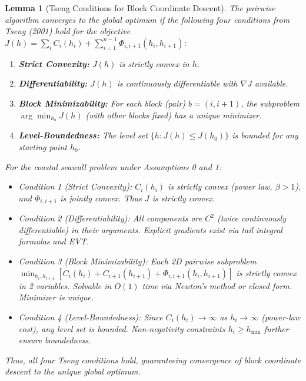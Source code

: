 \documentclass[12pt]{article}
\newtheorem{lemma}{Lemma}[section]
\theoremstyle{definition}
\begin{document}
\begin{lemma}[Tseng Conditions for Block Coordinate Descent]
\label{lem:tseng_conditions}
The pairwise algorithm converges to the global optimum if the following four conditions from Tseng (2001) hold for the objective $J(h) = \sum_i C_i(h_i) + \sum_{i=1}^{n-1} \Phi_{i,i+1}(h_i, h_{i+1})$:

\begin{enumerate}
    \item \textbf{Strict Convexity:} $J(h)$ is strictly convex in $h$.

    \item \textbf{Differentiability:} $J(h)$ is continuously differentiable with $\nabla J$ available.

    \item \textbf{Block Minimizability:} For each block (pair) $b = (i, i+1)$, the subproblem $\arg\min_{h_b} J(h)$ (with other blocks fixed) has a unique minimizer.

    \item \textbf{Level-Boundedness:} The level set $\{h : J(h) \leq J(h_0)\}$ is bounded for any starting point $h_0$.
\end{enumerate}

For the coastal seawall problem under Assumptions 0 and 1:
\begin{itemize}
    \item \emph{Condition 1 (Strict Convexity):} $C_i(h_i)$ is strictly convex (power law, $\beta > 1$), and $\Phi_{i,i+1}$ is jointly convex. Thus $J$ is strictly convex.

    \item \emph{Condition 2 (Differentiability):} All components are $C^2$ (twice continuously differentiable) in their arguments. Explicit gradients exist via tail integral formulas and EVT.

    \item \emph{Condition 3 (Block Minimizability):} Each 2D pairwise subproblem $\min_{h_i, h_{i+1}} [C_i(h_i) + C_{i+1}(h_{i+1}) + \Phi_{i,i+1}(h_i, h_{i+1})]$ is strictly convex in 2 variables. Solvable in $O(1)$ time via Newton's method or closed form. Minimizer is unique.

    \item \emph{Condition 4 (Level-Boundedness):} Since $C_i(h_i) \to \infty$ as $h_i \to \infty$ (power-law cost), any level set is bounded. Non-negativity constraints $h_i \geq h_{\min}$ further ensure boundedness.
\end{itemize}

Thus, all four Tseng conditions hold, guaranteeing convergence of block coordinate descent to the unique global optimum.
\end{lemma}
\end{document}
